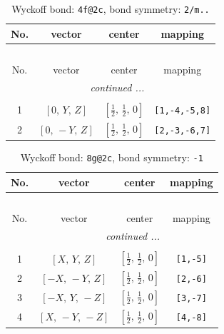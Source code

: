 \documentclass[fleqn,8pt]{jsarticle}
\begin{document}
\begin{longtable}{cccc}
\caption{Wyckoff bond: {\tt 4f@2c}, bond symmetry: {\tt 2/m..}}
 \\
 \hline \hline
No. & vector & center & mapping \\ \hline \endfirsthead

\multicolumn{3}{l}{\tablename\ \thetable{}} \\
 \hline \hline
No. & vector & center & mapping \\ \hline \endhead

 \hline \hline
\multicolumn{3}{r}{\footnotesize\it continued ...} \\ \endfoot

 \hline \hline
\multicolumn{3}{r}{} \\ \endlastfoot

1 & $\left[ 0,\, Y,\, Z \right]$ & $\left[ \frac{1}{2},\, \frac{1}{2},\, 0 \right]$ & {\tt [1,-4,-5,8]} \\ \hline
2 & $\left[ 0,\, - Y,\, Z \right]$ & $\left[ \frac{1}{2},\, \frac{1}{2},\, 0 \right]$ & {\tt [2,-3,-6,7]} \\
\end{longtable}
\renewcommand{\arraystretch}{1.2}
\begin{longtable}{cccc}
\caption{Wyckoff bond: {\tt 8g@2c}, bond symmetry: {\tt -1}}
 \\
 \hline \hline
No. & vector & center & mapping \\ \hline \endfirsthead

\multicolumn{3}{l}{\tablename\ \thetable{}} \\
 \hline \hline
No. & vector & center & mapping \\ \hline \endhead

 \hline \hline
\multicolumn{3}{r}{\footnotesize\it continued ...} \\ \endfoot

 \hline \hline
\multicolumn{3}{r}{} \\ \endlastfoot

1 & $\left[ X,\, Y,\, Z \right]$ & $\left[ \frac{1}{2},\, \frac{1}{2},\, 0 \right]$ & {\tt [1,-5]} \\ \hline
2 & $\left[ - X,\, - Y,\, Z \right]$ & $\left[ \frac{1}{2},\, \frac{1}{2},\, 0 \right]$ & {\tt [2,-6]} \\ \hline
3 & $\left[ - X,\, Y,\, - Z \right]$ & $\left[ \frac{1}{2},\, \frac{1}{2},\, 0 \right]$ & {\tt [3,-7]} \\ \hline
4 & $\left[ X,\, - Y,\, - Z \right]$ & $\left[ \frac{1}{2},\, \frac{1}{2},\, 0 \right]$ & {\tt [4,-8]} \\
\end{longtable}
\end{document}
